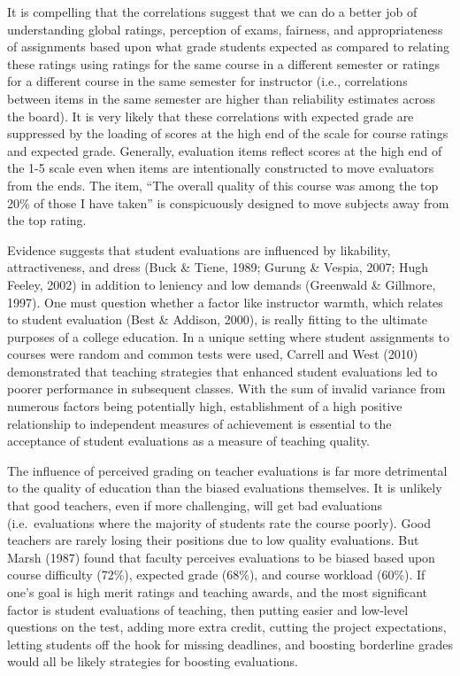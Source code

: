 \documentclass[,man]{apa6}
\theoremstyle{definition}
\theoremstyle{definition}
\theoremstyle{definition}
\theoremstyle{remark}
\begin{document}
It is compelling that the correlations suggest that we can do a better
job of understanding global ratings, perception of exams, fairness, and
appropriateness of assignments based upon what grade students expected
as compared to relating these ratings using ratings for the same course
in a different semester or ratings for a different course in the same
semester for instructor (i.e., correlations between items in the same
semester are higher than reliability estimates across the board). It is
very likely that these correlations with expected grade are suppressed
by the loading of scores at the high end of the scale for course ratings
and expected grade. Generally, evaluation items reflect scores at the
high end of the 1-5 scale even when items are intentionally constructed
to move evaluators from the ends. The item, \enquote{The overall quality
of this course was among the top 20\% of those I have taken} is
conspicuously designed to move subjects away from the top rating.

Evidence suggests that student evaluations are influenced by likability,
attractiveness, and dress (Buck \& Tiene, 1989; Gurung \& Vespia, 2007;
Hugh Feeley, 2002) in addition to leniency and low demands (Greenwald \&
Gillmore, 1997). One must question whether a factor like instructor
warmth, which relates to student evaluation (Best \& Addison, 2000), is
really fitting to the ultimate purposes of a college education. In a
unique setting where student assignments to courses were random and
common tests were used, Carrell and West (2010) demonstrated that
teaching strategies that enhanced student evaluations led to poorer
performance in subsequent classes. With the sum of invalid variance from
numerous factors being potentially high, establishment of a high
positive relationship to independent measures of achievement is
essential to the acceptance of student evaluations as a measure of
teaching quality.

The influence of perceived grading on teacher evaluations is far more
detrimental to the quality of education than the biased evaluations
themselves. It is unlikely that good teachers, even if more challenging,
will get bad evaluations (i.e.~evaluations where the majority of
students rate the course poorly). Good teachers are rarely losing their
positions due to low quality evaluations. But Marsh (1987) found that
faculty perceives evaluations to be biased based upon course difficulty
(72\%), expected grade (68\%), and course workload (60\%). If one's goal
is high merit ratings and teaching awards, and the most significant
factor is student evaluations of teaching, then putting easier and
low-level questions on the test, adding more extra credit, cutting the
project expectations, letting students off the hook for missing
deadlines, and boosting borderline grades would all be likely strategies
for boosting evaluations.
\end{document}
